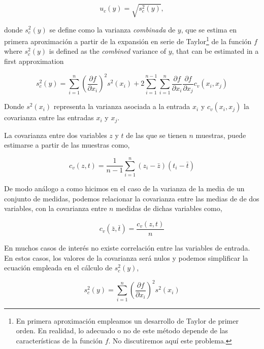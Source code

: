 \begin{equation*}
u_c(y) =\sqrt{s_c^2(y)},
\end{equation*}

\begin{paracol}{2}
donde  $s_c^2(y)$ se define como la  varianza \emph{combinada} de $y$, que se estima en primera aproximación a partir de la expansión en serie de Taylor\footnote{En primera aproximación empleamos un desarrollo de Taylor de primer orden. En realidad, lo adecuado o no de este método depende de las características de la función $f$. No discutiremos aquí este problema.} de la función $f$	
\switchcolumn
where $s_c^2(y)$ is defined as the \emph{combined} variance of $y$, that can be estimated in a first approximation 
\end{paracol}
\begin{equation*}
s_c^2(y) = \sum_{i=1}^n\left(\frac{\partial f}{\partial x_i}\right)^2 s^2(x_i) + 2\sum_{i=1}^{n-1}\sum_{i=1}^n \frac{\partial f}{\partial x_i}\frac{\partial f}{\partial x_j} c_v(x_i,x_j)
\end{equation*}

Donde $s^2(x_i)$  representa la varianza asociada a la entrada $x_i$ y $c_v(x_i, x_j)$ la covarianza entre las entradas $x_i$ y $x_j$. 

La covarianza entre dos variables $z$ y $t$ de las que se tienen $n$ muestras, puede estimarse a partir de las muestras como,

\begin{equation*}
c_v(z,t) =\frac{1}{n-1}\sum_{i=1}^n(z_i-\bar{z})(t_i-\bar{t})
\end{equation*}

De modo análogo a como hicimos en el caso de la varianza de la media de un conjunto de medidas, podemos relacionar la covarianza entre las medias de  de dos variables, con la covarianza entre $n$ medidas de dichas variables como,

\begin{equation*}
c_v(\bar{z},\bar{t}) =\frac{c_v(z,t)}{n}
\end{equation*}

En muchos casos de interés no existe correlación entre las variables de entrada. En estos casos, los valores de la covarianza será nulos y podemos simplificar la ecuación empleada en el cálculo de $s_c^2(y)$,

\begin{equation*}
s_c^2(y) = \sum_{i=1}^n\left(\frac{\partial f}{\partial x_i}\right)^2 s^2(x_i)
\end{equation*}



